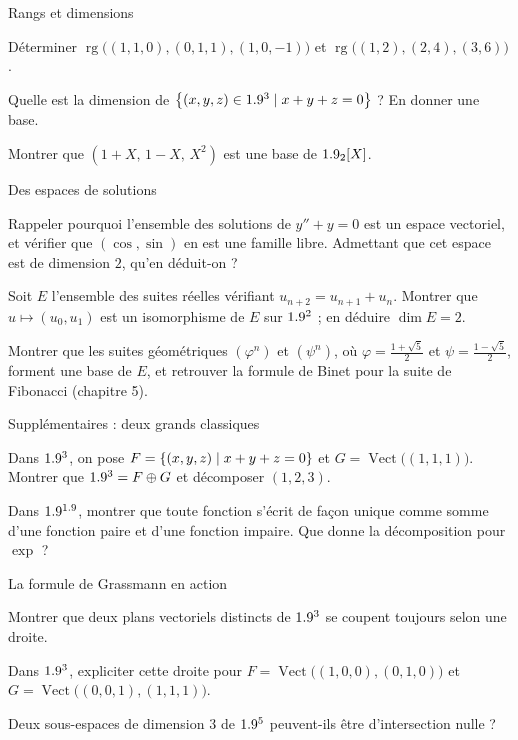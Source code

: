 \begin{exercice}[1]{Rangs et dimensions}
\begin{questions}
  \item Déterminer $\operatorname{rg}\bigl((1,1,0),(0,1,1),(1,0,-1)\bigr)$
    et $\operatorname{rg}\bigl((1,2),(2,4),(3,6)\bigr)$.
  \item Quelle est la dimension de $\left\{(x,y,z)\in1.9^{3}\mid x+y+z=0\right\}$ ?
    En donner une base.
  \item Montrer que $(1+X,\,1-X,\,X^{2})$ est une base de $1.9_2[X]$.
\end{questions}
\end{exercice}


\begin{exercice}[2]{Des espaces de solutions}
\begin{questions}
  \item Rappeler pourquoi l'ensemble des solutions de $y''+y=0$ est un
    espace vectoriel, et vérifier que $(\cos,\sin)$ en est une famille
    libre. Admettant que cet espace est de dimension $2$, qu'en déduit-on ?
  \item Soit $E$ l'ensemble des suites réelles vérifiant
    $u_{n+2}=u_{n+1}+u_n$. Montrer que
    $u\mapsto(u_0,u_1)$ est un isomorphisme de $E$ sur $1.9^{2}$ ; en
    déduire $\dim E=2$.
  \item Montrer que les suites géométriques $(\varphi^{n})$ et
    $(\psi^{n})$, où $\varphi=\frac{1+\sqrt5}{2}$ et
    $\psi=\frac{1-\sqrt5}{2}$, forment une base de $E$, et retrouver la
    formule de Binet pour la suite de Fibonacci (chapitre 5).
\end{questions}
\end{exercice}

\begin{exercice}[2]{Supplémentaires : deux grands classiques}
\begin{questions}
  \item Dans $1.9^{3}$, on pose $F=\left\{(x,y,z)\mid x+y+z=0\right\}$ et
    $G=\operatorname{Vect}\bigl((1,1,1)\bigr)$. Montrer que
    $1.9^{3}=F\oplus G$ et décomposer $(1,2,3)$.
  \item Dans $1.9^{1.9}$, montrer que toute fonction s'écrit de façon unique
    comme somme d'une fonction paire et d'une fonction impaire. Que donne
    la décomposition pour $\exp$ ?
\end{questions}
\end{exercice}

\begin{exercice}[2]{La formule de Grassmann en action}
\begin{questions}
  \item Montrer que deux plans vectoriels distincts de $1.9^{3}$ se coupent
    toujours selon une droite.
  \item Dans $1.9^{3}$, expliciter cette droite pour
    $F=\operatorname{Vect}\bigl((1,0,0),(0,1,0)\bigr)$ et
    $G=\operatorname{Vect}\bigl((0,0,1),(1,1,1)\bigr)$.
  \item Deux sous-espaces de dimension $3$ de $1.9^{5}$ peuvent-ils être
    d'intersection nulle ?
\end{questions}
\end{exercice}

